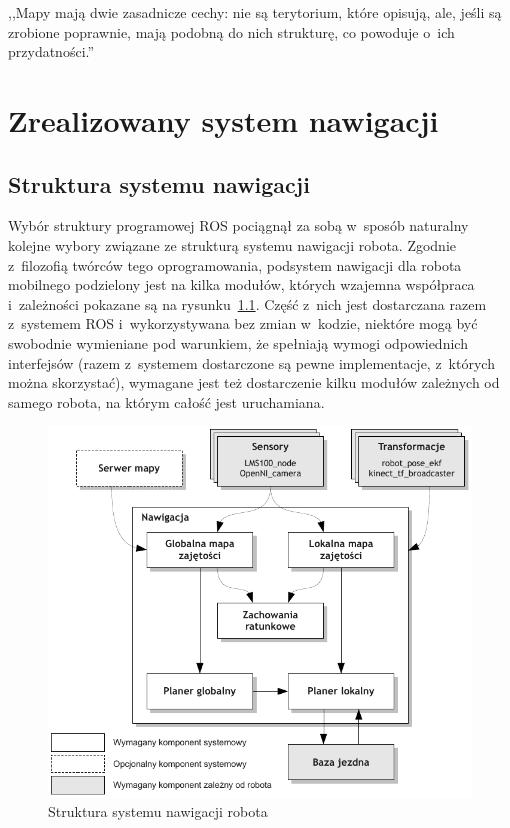 

\begin{savequote}[70mm]
,,Mapy mają dwie zasadnicze cechy: nie są terytorium, które opisują, ale, jeśli
są zrobione poprawnie, mają podobną do nich strukturę, co powoduje o~ich
przydatności.''
\end{savequote}


\chapter{Zrealizowany system nawigacji}
\label{chap:mapa}

\section{Struktura systemu nawigacji}

Wybór struktury programowej ROS pociągnął za sobą w~sposób naturalny kolejne
wybory związane ze strukturą systemu nawigacji robota. Zgodnie z~filozofią
twórców tego oprogramowania, podsystem nawigacji dla robota mobilnego podzielony
jest na kilka modułów, których wzajemna współpraca i~zależności pokazane są na
rysunku~\ref{fig:diag_move_base}. Część z~nich jest dostarczana razem z~systemem
ROS i~wykorzystywana bez zmian w~kodzie, niektóre mogą być
swobodnie wymieniane pod warunkiem, że spełniają wymogi odpowiednich interfejsów
(razem z~systemem dostarczone są pewne implementacje, z~których można
skorzystać), wymagane jest też dostarczenie kilku modułów zależnych od samego
robota, na którym całość jest uruchamiana.

\begin{figure}[h!]
\centering
\includegraphics{../img/diag_move_base}
\caption{Struktura systemu nawigacji robota}
\label{fig:diag_move_base}
\end{figure}

